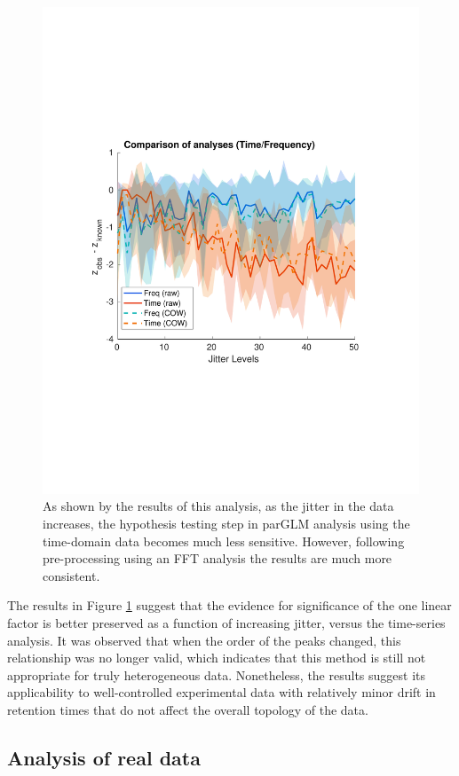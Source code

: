 \documentclass[preprint,12pt]{elsarticle}
\begin{document}
\begin{figure}[hbt!]
    \centering
    \includegraphics[width=0.9\linewidth]{comparison.pdf}
    \caption{As shown by the results of this analysis, as the jitter in the data increases, the hypothesis testing step in parGLM analysis using the time-domain data becomes much less sensitive. However, following pre-processing using an FFT analysis the results are much more consistent.}
    \label{fig:compare}
\end{figure}

The results in Figure \ref{fig:compare} suggest that the evidence for significance of the one linear factor is better preserved as a function of increasing jitter, versus the time-series analysis. It was observed that when the order of the peaks changed, this relationship was no longer valid, which indicates that this method is still not appropriate for truly heterogeneous data. Nonetheless, the results suggest its applicability to well-controlled experimental data with relatively minor drift in retention times that do not affect the overall topology of the data.

\subsection{Analysis of real data}
\end{document}
